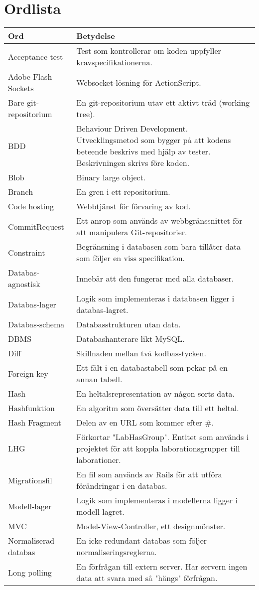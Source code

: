 \section{Ordlista}
\label{sec:ordlista}
\small
\begin{tabular} { | l | p{10cm} | }
\hline
\bf{Ord} & \bf{Betydelse} \\
\hline
Acceptance test	& Test som kontrollerar om koden uppfyller kravspecifikationerna. \\
\hline
Adobe Flash Sockets & Websocket-lösning för ActionScript. \\
\hline
Bare git-repositorium & En git-repositorium utav ett aktivt träd (working tree). \\
\hline
BDD & Behaviour Driven Development. Utvecklingsmetod som bygger på att kodens
beteende beskrivs med hjälp av tester. Beskrivningen skrivs före koden. \\
\hline
Blob & Binary large object.\\
\hline
Branch & En gren i ett repositorium. \\
\hline
Code hosting & Webbtjänst för förvaring av kod. \\
\hline
CommitRequest & Ett anrop som används av webbgränssnittet för att manipulera Git-repositorier. \\
\hline
Constraint & Begränsning i databasen som bara tillåter data som följer en viss specifikation. \\
\hline
Databas-agnostisk & Innebär att den fungerar med alla databaser. \\
\hline
Databas-lager & Logik som implementeras i databasen ligger i databas-lagret. \\
\hline
Databas-schema & Databasstrukturen utan data. \\
\hline
DBMS & Databashanterare likt MySQL. \\
\hline
Diff & Skillnaden mellan två kodbasstycken. \\
\hline
Foreign key & Ett fält i en databastabell som pekar på en annan tabell. \\
\hline
Hash & En heltalsrepresentation av någon sorts data. \\
\hline
Hashfunktion & En algoritm som översätter data till ett heltal. \\
\hline
Hash Fragment & Delen av en URL som kommer efter \#. \\
\hline
LHG & Förkortar "LabHasGroup". Entitet som används i projektet för att koppla laborationsgrupper till laborationer. \\
\hline
Migrationsfil & En fil som används av Rails för att utföra förändringar i en databas. \\
\hline
Modell-lager & Logik som implementeras i modellerna ligger i modell-lagret. \\
\hline
MVC & Model-View-Controller, ett designmönster. \\
\hline
Normaliserad databas & En icke redundant databas som följer normaliseringsreglerna. \\
\hline
Long polling & En förfrågan till extern server. Har servern ingen data att svara med så "hängs" förfrågan. \\
\hline
\end{tabular}

